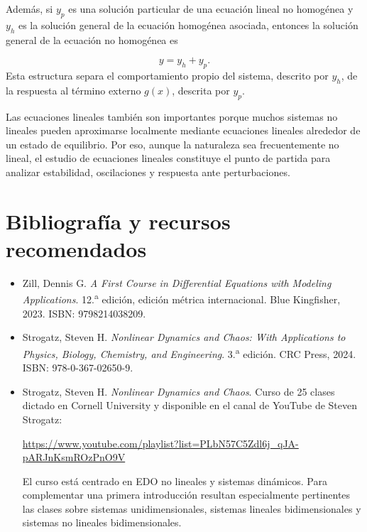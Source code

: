 \documentclass[12pt,a4paper]{article}
\begin{document}
	Además, si \(y_p\) es una solución particular de una ecuación lineal no homogénea y \(y_h\) es la solución general de la ecuación homogénea asociada, entonces la solución general de la ecuación no homogénea es
	
	\[
	y=y_h+y_p.
	\]
	Esta estructura separa el comportamiento propio del sistema, descrito por \(y_h\), de la respuesta al término externo \(g(x)\), descrita por \(y_p\).
	
	Las ecuaciones lineales también son importantes porque muchos sistemas no lineales pueden aproximarse localmente mediante ecuaciones lineales alrededor de un estado de equilibrio. Por eso, aunque la naturaleza sea frecuentemente no lineal, el estudio de ecuaciones lineales constituye el punto de partida para analizar estabilidad, oscilaciones y respuesta ante perturbaciones.
	
	\clearpage
	\section*{Bibliografía y recursos recomendados}
	
	\begin{itemize}[leftmargin=*]
		\item Zill, Dennis G. \textit{A First Course in Differential Equations with Modeling Applications}. 12.\textsuperscript{a} edición, edición métrica internacional. Blue Kingfisher, 2023. ISBN: 9798214038209.
		
		\item Strogatz, Steven H. \textit{Nonlinear Dynamics and Chaos: With Applications to Physics, Biology, Chemistry, and Engineering}. 3.\textsuperscript{a} edición. CRC Press, 2024. ISBN: 978-0-367-02650-9.
		
		\item Strogatz, Steven H. \textit{Nonlinear Dynamics and Chaos}. Curso de 25 clases dictado en Cornell University y disponible en el canal de YouTube de Steven Strogatz:
		
		\begin{center}
			\url{https://www.youtube.com/playlist?list=PLbN57C5Zdl6j_qJA-pARJnKsmROzPnO9V}
		\end{center}
		
		El curso está centrado en EDO no lineales y sistemas dinámicos. Para complementar una primera introducción resultan especialmente pertinentes las clases sobre sistemas unidimensionales, sistemas lineales bidimensionales y sistemas no lineales bidimensionales.
	\end{itemize}
	
\end{document}
